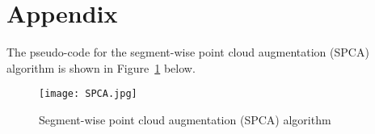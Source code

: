   
  


\newpage
\appendix
\section*{Appendix}

The pseudo-code for the segment-wise point cloud augmentation (SPCA) algorithm is shown in Figure~\ref{fig_SPCA} below.
\label{apsec: SPCA}

\begin{figure}[h]
    \centering
    \texttt{[image: SPCA.jpg]}
    \caption{Segment-wise point cloud augmentation (SPCA) algorithm}
    \label{fig_SPCA}
\end{figure}



